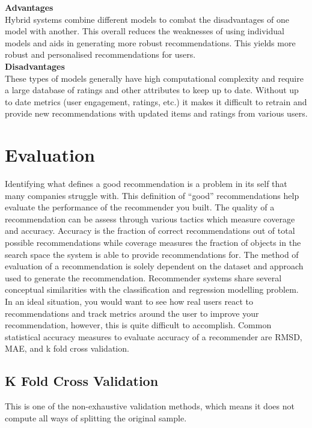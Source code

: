 \textbf{Advantages}
\\Hybrid systems combine different models to combat the disadvantages of one model with another. This overall reduces the weaknesses of using individual models and aids in generating more robust recommendations. This yields more robust and personalised recommendations for users.
\\\textbf{Disadvantages}
\\These types of models generally have high computational complexity and require a large database of ratings and other attributes to keep up to date. Without up to date metrics (user engagement, ratings, etc.) it makes it difficult to retrain and provide new recommendations with updated items and ratings from various users.

\section{Evaluation}
Identifying what defines a good recommendation is a problem in its self that many companies struggle with. This definition of “good” recommendations help evaluate the performance of the recommender you built. The quality of a recommendation can be assess through various tactics which measure coverage and accuracy. Accuracy is the fraction of correct recommendations out of total possible recommendations while coverage measures the fraction of objects in the search space the system is able to provide recommendations for. The method of evaluation of a recommendation is solely dependent on the dataset and approach used to generate the recommendation. Recommender systems share several conceptual similarities with the classification and regression modelling problem. In an ideal situation, you would want to see how real users react to recommendations and track metrics around the user to improve your recommendation, however, this is quite difficult to accomplish. Common statistical accuracy measures to evaluate accuracy of a recommender are RMSD, MAE, and k fold cross validation.

\subsection{K Fold Cross Validation}
This is one of the non-exhaustive validation methods, which means it does not compute all ways of splitting the original sample.

